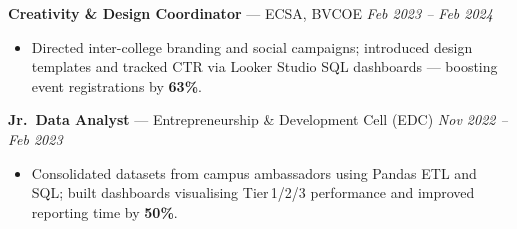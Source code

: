 \documentclass[10pt,a4paper]{article}
\newcommand{\role}[3]{%
  \vspace{5pt}%
  \textbf{#1} \textnormal{\textcolor{midgrey}{--- #2}}%
  \hfill\textcolor{midgrey}{\textit{#3}}%
  \vspace{1pt}%
}
\begin{document}
\role{Creativity \& Design Coordinator}{ECSA, BVCOE}{Feb 2023 -- Feb 2024}
\begin{itemize}
  \item Directed inter-college branding and social campaigns; introduced design templates
        and tracked CTR via Looker Studio SQL dashboards ---
        boosting event registrations by \textbf{63\%}.
\end{itemize}

\role{Jr.\ Data Analyst}{Entrepreneurship \& Development Cell (EDC)}{Nov 2022 -- Feb 2023}
\begin{itemize}
  \item Consolidated datasets from campus ambassadors using Pandas ETL and SQL; built
        dashboards visualising Tier\,1/2/3 performance and improved reporting time
        by \textbf{50\%}.
\end{itemize}
\end{document}
